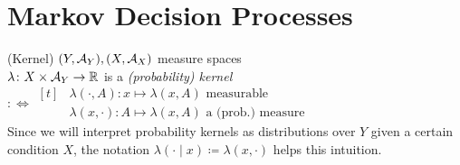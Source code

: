 \chapter{Markov Decision Processes}
\begin{definition}(Kernel)
	\((Y,\mathcal{A}_Y), (X,\mathcal{A}_X)\) measure spaces\\
	 \(\lambda\colon X\times\mathcal{A}_Y\to \mathbb{R}\) is a \emph{(probability) kernel} \(
	 :\iff \begin{aligned}[t]
	 &\lambda(\cdot,A)\colon x\mapsto \lambda(x,A) \text{ measurable}\\
	 &\lambda(x,\cdot)\colon A\mapsto \lambda(x,A) \text{ a (prob.) measure}
	 \end{aligned}
	  \)\\
	  Since we will interpret probability kernels as distributions over \(Y\) given a  certain condition \(X\), the notation \(\lambda(\cdot\mid x) \coloneqq \lambda(x,\cdot)\) helps this intuition. 
\end{definition}
